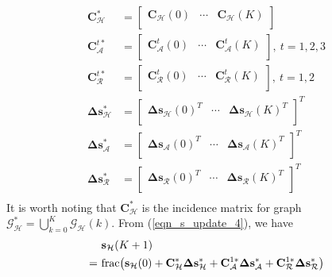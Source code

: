 \documentclass{IEEEtran}
\begin{document}
\begin{equation}
	\begin{aligned}
		\mathbf{C}_{\mathcal{H}}^* & =
		\begin{bmatrix}
			\mathbf{C}_{\mathcal{H}}(0) & \cdots & \mathbf{C}_{\mathcal{H}}(K)\\
		\end{bmatrix} \\
		\mathbf{C}_{\mathcal{A}}^{t*} & =
		\begin{bmatrix}
			\mathbf{C}_{\mathcal{A}}^t(0) & \cdots & \mathbf{C}_{\mathcal{A}}^t(K)\\
		\end{bmatrix}, \ t=1,2,3 \\
		\mathbf{C}_{\mathcal{R}}^{t*} & =
		\begin{bmatrix}
			\mathbf{C}_{\mathcal{R}}^t(0) & \cdots & \mathbf{C}_{\mathcal{R}}^t(K)\\
		\end{bmatrix}, \ t=1,2 \\
		\boldsymbol{\Delta}\mathbf{s}_{\mathcal{H}}^* & =
		\begin{bmatrix}
			\boldsymbol{\Delta}\mathbf{s}_{\mathcal{H}}(0)^T & \cdots & \boldsymbol{\Delta}\mathbf{s}_{\mathcal{H}}(K)^T\\
		\end{bmatrix}^T \\
		\boldsymbol{\Delta}\mathbf{s}_{\mathcal{A}}^* & =
		\begin{bmatrix}
			\boldsymbol{\Delta}\mathbf{s}_{\mathcal{A}}(0)^T & \cdots & \boldsymbol{\Delta}\mathbf{s}_{\mathcal{A}}(K)^T\\
		\end{bmatrix}^T \\
		\boldsymbol{\Delta}\mathbf{s}_{\mathcal{R}}^* & =
		\begin{bmatrix}
			\boldsymbol{\Delta}\mathbf{s}_{\mathcal{R}}(0)^T & \cdots & \boldsymbol{\Delta}\mathbf{s}_{\mathcal{R}}(K)^T\\
		\end{bmatrix}^T \\
	\end{aligned} 
\end{equation}
It is worth noting that $\mathbf{C}_{\mathcal{H}}^*$ is the incidence matrix for graph $\mathcal{G}_{\mathcal{H}}^* = \bigcup\limits_{k=0}^K \mathcal{G_H}(k)$. From (\ref{eqn_s_update_4}), we have
\begin{equation}\label{eqn_s_update_5}
	\begin{aligned}
		& \mathbf{s}_{\mathcal{H}}(K+1) \\
		= \ & {\rm frac}\big(\mathbf{s}_{\mathcal{H}}(0) + \mathbf{C}_{\mathcal{H}}^* \boldsymbol{\Delta}\mathbf{s}_{\mathcal{H}}^* + \mathbf{C}_{\mathcal{A}}^{1*}
		\boldsymbol{\Delta}\mathbf{s}_{\mathcal{A}}^* + \mathbf{C}_{\mathcal{R}}^{1*}
		\boldsymbol{\Delta}\mathbf{s}_{\mathcal{R}}^*\big)
	\end{aligned} 
\end{equation}
\end{document}

